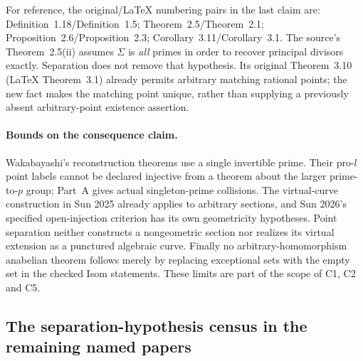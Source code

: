 For reference, the original/LaTeX numbering pairs in the last
claim are: Definition~1.18/Definition~1.5;
Theorem~2.5/Theorem~2.1; Proposition~2.6/Proposition~2.3;
Corollary~3.11/Corollary~3.1. The source's
Theorem~2.5(ii) assumes $\Sigma$ is \emph{all} primes in order
to recover principal divisors exactly. Separation does not remove
that hypothesis. Its original Theorem~3.10 (LaTeX Theorem~3.1)
already permits arbitrary matching rational points; the new
fact makes the matching point unique, rather than supplying a
previously absent arbitrary-point existence assertion.

\paragraph{Bounds on the consequence claim.}
Wakabayashi's reconstruction theorems use a single invertible
prime. Their pro-$l$ point labels cannot be declared injective
from a theorem about the larger prime-to-$p$ group; Part~A gives
actual singleton-prime collisions. The virtual-curve construction
in Sun 2025 already applies to arbitrary sections, and Sun 2026's
specified open-injection criterion has its own geometricity
hypotheses. Point separation neither constructs a nongeometric
section nor realizes its virtual extension as a punctured
algebraic curve. Finally no arbitrary-homomorphism anabelian
theorem follows merely by replacing exceptional sets with the
empty set in the checked Isom statements. These limits are part
of the scope of C1, C2 and C5.

\subsection{The separation-hypothesis census in the remaining named papers}

